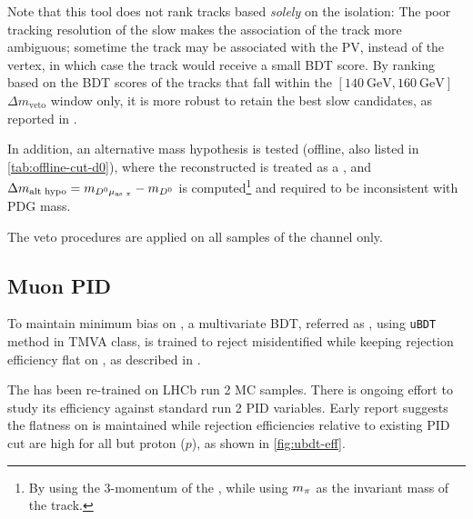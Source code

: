 Note that this tool does not rank tracks based \emph{solely} on the isolation:
The poor tracking resolution of the slow \pion makes the association of
the track more ambiguous; sometime the track may be associated with the PV,
instead of the \B vertex, in which case the track would receive a small BDT
score.
By ranking based on the BDT scores of the tracks that fall within the
$[140~\text{GeV}, 160~\text{GeV}]$
$\Delta m_\text{veto}$ window only,
it is more robust to retain the best slow \pion candidates,
as reported in \cite{LHCb-ANA-2020-056}.

In addition, an alternative mass hypothesis is tested
(offline, also listed in \cref{tab:offline-cut-d0}), where the reconstructed
\muon is treated as a \pion,
and $\Delta m_\text{alt hypo} = m_{{{D}^0}{\mu}_\text{as {\ensuremath{\pi}}}} - m_{{D}^0}$
is computed\footnote{
    By using the 3-momentum of the \muon, while using $m_{\pi}$ as the invariant
    mass of the track.
} and required to be inconsistent with \Dstar PDG mass.

The veto procedures are applied on all samples of the \Dz channel only.


\subsection{Muon PID}
\label{ref:sel:algo:ubdt}

To maintain minimum bias on \muon \pt, a multivariate BDT,
referred as \UBDT, using \texttt{uBDT} method in TMVA class,
is trained to reject misidentified \muon while keeping rejection
efficiency flat on \pt,
as described in \cite{LHCb-ANA-2020-056}.

The \UBDT has been re-trained on LHCb run 2 MC samples.
There is ongoing effort to study its efficiency against standard run 2 PID
variables.
Early report suggests the flatness on \pt is maintained while rejection
efficiencies relative to existing PID cut are high for all but proton ($p$),
as shown in \cref{fig:ubdt-eff}.

